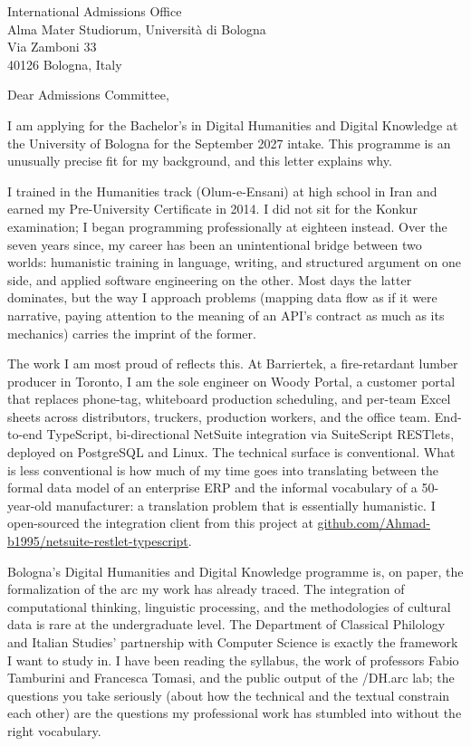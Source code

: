 




\begin{letter}{
  International Admissions Office\\
  Alma Mater Studiorum, Università di Bologna\\
  Via Zamboni 33\\
  40126 Bologna, Italy
}

\opening{Dear Admissions Committee,}

I am applying for the Bachelor's in Digital Humanities and Digital Knowledge at the University of Bologna for the September 2027 intake. This programme is an unusually precise fit for my background, and this letter explains why.

I trained in the Humanities track (Olum-e-Ensani) at high school in Iran and earned my Pre-University Certificate in 2014. I did not sit for the Konkur examination; I began programming professionally at eighteen instead. Over the seven years since, my career has been an unintentional bridge between two worlds: humanistic training in language, writing, and structured argument on one side, and applied software engineering on the other. Most days the latter dominates, but the way I approach problems (mapping data flow as if it were narrative, paying attention to the meaning of an API's contract as much as its mechanics) carries the imprint of the former.

The work I am most proud of reflects this. At Barriertek, a fire-retardant lumber producer in Toronto, I am the sole engineer on Woody Portal, a customer portal that replaces phone-tag, whiteboard production scheduling, and per-team Excel sheets across distributors, truckers, production workers, and the office team. End-to-end TypeScript, bi-directional NetSuite integration via SuiteScript RESTlets, deployed on PostgreSQL and Linux. The technical surface is conventional. What is less conventional is how much of my time goes into translating between the formal data model of an enterprise ERP and the informal vocabulary of a 50-year-old manufacturer: a translation problem that is essentially humanistic. I open-sourced the integration client from this project at \href{https://github.com/Ahmad-b1995/netsuite-restlet-typescript}{github.com/Ahmad-b1995/netsuite-restlet-typescript}.

Bologna's Digital Humanities and Digital Knowledge programme is, on paper, the formalization of the arc my work has already traced. The integration of computational thinking, linguistic processing, and the methodologies of cultural data is rare at the undergraduate level. The Department of Classical Philology and Italian Studies' partnership with Computer Science is exactly the framework I want to study in. I have been reading the syllabus, the work of professors Fabio Tamburini and Francesca Tomasi, and the public output of the /DH.arc lab; the questions you take seriously (about how the technical and the textual constrain each other) are the questions my professional work has stumbled into without the right vocabulary.


\end{letter}
